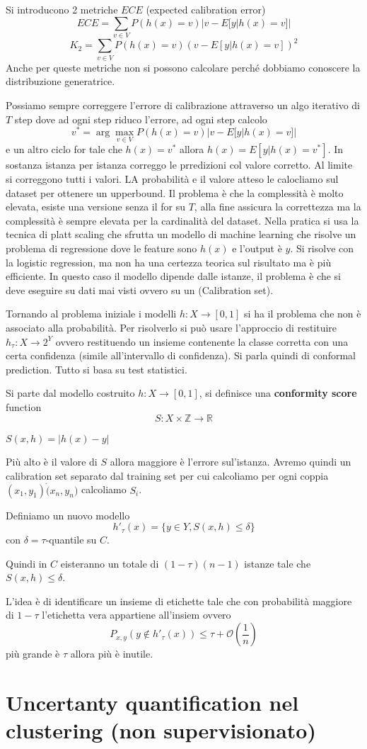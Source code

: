 Si introducono 2 metriche $ECE$ (expected calibration error) 
$$ECE = \sum_{v\in V}P(h(x)=v)|v-E[y|h(x)=v]|$$
$$K_2 = \sum_{v\in V}P(h(x)=v)(v-E[y|h(x)=v])^2$$
Anche per queste metriche non si possono calcolare perché dobbiamo conoscere la distribuzione generatrice.

Possiamo sempre correggere l'errore di calibrazione attraverso un algo iterativo di $T$ step dove ad ogni step 
riduco l'errore, ad ogni step calcolo 
$$v^\ast = \arg\max_{v\in V}P(h(x)=v)|v-E[y|h(x)=v]|$$ 
e un altro ciclo for tale che $h(x)=v^\ast $ allora $h(x)=E[y|h(x)=v^\ast]$. 
In sostanza istanza per istanza correggo le prredizioni col valore corretto. Al limite si correggono tutti i valori.
LA probabilità e il valore atteso le calocliamo sul dataset per ottenere un upperbound. Il problema è che 
la complessità è molto elevata, esiste una versione senza il for su $T$, alla fine assicura la correttezza 
ma la complessità è sempre elevata per la cardinalità del dataset. Nella pratica si usa la tecnica 
di platt scaling che sfrutta un modello di machine learning che risolve un problema di regressione 
dove le feature sono $h(x)$ e l'output è $y$. Si risolve con la logistic regression,
ma non ha una certezza teorica sul risultato ma è più efficiente.
In questo caso il modello dipende dalle istanze, il problema è che si deve eseguire 
su dati mai visti ovvero su un (Calibration set).

Tornando al problema iniziale i modelli $h:X\to [0,1]$  si ha il problema che non 
è associato alla probabilità. Per risolverlo si può usare l'approccio di 
restituire $h_\tau :X\to 2^Y$ ovvero restituendo un insieme contenente la classe 
corretta con una certa confidenza (simile all'intervallo di confidenza). Si parla 
quindi di conformal prediction. Tutto si basa su test statistici.

Si parte dal modello costruito $h:X\to [0,1]$, si definisce una \textbf{conformity score}
function 
$$S:X\times \mathbb{Z} \to \mathbb{R}$$
\begin{esempio}
    $S(x,h) = |h(x)-y|$
\end{esempio}
Più alto è il valore di $S$ allora maggiore è l'errore sul'istanza. Avremo 
quindi un calibration set separato dal training set per cui calcoliamo per ogni
coppia $(x_1,y_1)\dot(x_n,y_n)$ calcoliamo $S_i$.

Definiamo un nuovo modello 
$$h'_\tau(x)=\{y\in Y, S(x,h)\le \delta\}$$
con $\delta = \tau$-quantile su $C$. 

Quindi in $C$ eisteranno un totale di $(1-\tau)(n-1)$ istanze tale che $S(x,h)\le \delta$.

L'idea è di identificare un insieme di etichette tale che con probabilità maggiore
di $1-\tau$ l'etichetta vera appartiene all'insiem ovvero 
$$P_{x,y}(y\not \in h'_\tau(x))\le \tau + \mathcal{O}(\frac{1}{n})$$
più grande è $\tau$ allora più è inutile.



\section*{Uncertanty quantification nel clustering (non supervisionato)}
